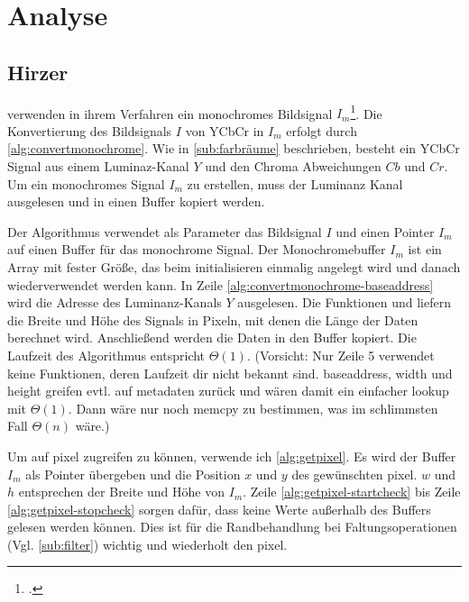 \section{Analyse} %
\label{sec:analyse}
\begin{comment}
	Detailierte Beschreibung der Algorithmen inkl. O-Notation (Nitty-Gritty Darstellung der Algos)
	1. ARToolKit
	2. ARToolKitPlus
	3. Zissermann/Clarke
	Analyse: Die auswertung nach den Kriterein aus Kap. Vorgehen OHNE WERTUNG! Nur die Daten erheben und auswerten.
\end{comment}

\subsection{Hirzer} %
\label{sub:hirzer}

\citeauthor{clarke96} verwenden in ihrem Verfahren ein monochromes Bildsignal $I_m$\footcite[Vgl.][S.~417]{clarke96}.
 Die Konvertierung des Bildsignals $I$ von YCbCr in $I_m$ erfolgt durch \autoref{alg:convertmonochrome}. Wie in
 \autoref{sub:farbräume} beschrieben, besteht ein YCbCr Signal aus einem Luminaz-Kanal $Y$ und den Chroma Abweichungen
 $Cb$ und $Cr$. Um ein monochromes Signal $I_m$ zu erstellen, muss der Luminanz Kanal ausgelesen und in einen Buffer
 kopiert werden.



Der Algorithmus verwendet als Parameter das Bildsignal $I$ und einen Pointer $I_m$ auf einen Buffer für das monochrome
 Signal. Der Monochromebuffer $I_m$ ist ein Array mit fester Größe, das beim initialisieren einmalig angelegt wird und
 danach wiederverwendet werden kann. In Zeile \ref{alg:convertmonochrome-baseaddress} wird die Adresse des
 Luminanz-Kanals $Y$ ausgelesen. Die Funktionen  und  liefern die Breite und Höhe des
 Signals in Pixeln, mit denen die Länge der Daten berechnet wird. Anschließend werden die Daten in den Buffer kopiert.
 Die Laufzeit des Algorithmus entspricht $\Theta(1)$. (Vorsicht: Nur Zeile 5 verwendet keine Funktionen, deren Laufzeit
 dir nicht bekannt sind. baseaddress, width und height greifen evtl. auf metadaten zurück und wären damit ein einfacher
 lookup mit $\Theta(1)$. Dann wäre nur noch memcpy zu bestimmen, was im schlimmsten Fall $\Theta(n)$ wäre.)

Um auf \gls{pixel} zugreifen zu können, verwende ich \autoref{alg:getpixel}. Es wird der Buffer $I_m$ als Pointer
 übergeben und die Position $x$ und $y$ des gewünschten \gls{pixel}. $w$ und $h$ entsprechen der Breite und Höhe von
 $I_m$. Zeile \ref{alg:getpixel-startcheck} bis Zeile \ref{alg:getpixel-stopcheck} sorgen dafür, dass keine Werte
 außerhalb des Buffers gelesen werden können. Dies ist für die Randbehandlung bei Faltungsoperationen
 (Vgl. \autoref{sub:filter}) wichtig und wiederholt den \gls{pixel}.

